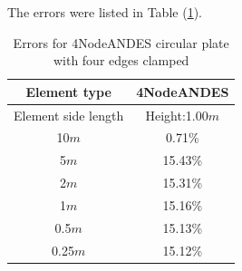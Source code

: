 \documentclass[fleqn,11pt]{article}
\begin{document}
The errors were listed in Table (\ref{table errors for 4NodeANDES circular plate with four edges clamped}).

\begin{table}[H]
  \centering
      \caption{Errors for 4NodeANDES circular plate with four edges clamped}
  \label{table errors for 4NodeANDES circular plate with four edges clamped}
\begin{tabular}{|c|c|}
\hline
Element type     & 4NodeANDES          \\ \hline
Element side length & Height:1.00$m$   \\ \hline
10$m$            & 0.71\%         \\ \hline
5$m$             & 15.43\%        \\ \hline
2$m$             & 15.31\%        \\ \hline
1$m$             & 15.16\%        \\ \hline
0.5$m$           & 15.13\%        \\ \hline
0.25$m$          & 15.12\%       \\
\hline
\end{tabular}
\end{table}

\end{document}
